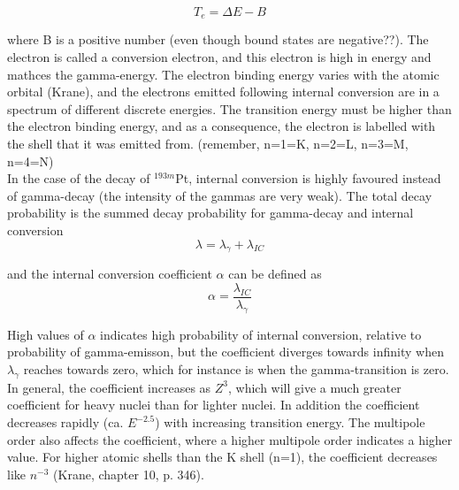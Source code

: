 \documentclass[a4paper,11pt,twoside]{book}
\begin{document}
\begin{equation}
    T_e = \Delta E - B
\end{equation}

where B is a positive number (even though bound states are negative??). The electron is called a conversion electron, and this electron is high in energy and mathces the gamma-energy. 
The electron binding energy varies with the atomic orbital (Krane), and the electrons emitted following internal conversion are in a spectrum of different discrete energies. The transition energy must be higher than the electron binding energy, and as a consequence, the electron is labelled with the shell that it was emitted from. (remember, n=1=K, n=2=L, n=3=M, n=4=N) \\ 

In the case of the decay of $^{193m}$Pt, internal conversion is highly favoured instead of gamma-decay (the intensity of the gammas are very weak). The total decay probability is the summed decay probability for gamma-decay and internal conversion
\begin{equation}
\lambda = \lambda_\gamma + \lambda_{IC}    
\end{equation}

and the internal conversion coefficient $\alpha$ can be defined as
\begin{equation}
    \alpha = \frac{\lambda_{IC}}{\lambda_\gamma}
\end{equation}

High values of $\alpha$ indicates high probability of internal conversion, relative to probability of gamma-emisson, but the coefficient diverges towards infinity when $\lambda_\gamma$ reaches towards zero, which for instance is when the gamma-transition is zero. In general, the coefficient increases as $Z^3$, which will give a much greater coefficient for heavy nuclei than for lighter nuclei. In addition the coefficient decreases rapidly (ca. $E^{-2.5}$) with increasing transition energy. The multipole order also affects the coefficient, where a higher multipole order indicates a higher value. For higher atomic shells than the K shell (n=1), the coefficient decreases like $n^{-3}$ (Krane, chapter 10, p. 346). \\
\end{document}
